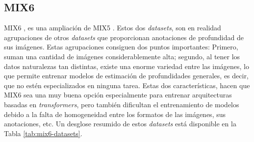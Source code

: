 \subsection{MIX6}
MIX6 \cite{visiontransformersDPT}, es una ampliación de MIX5 \cite{midas-intel}. Estos dos \textit{datasets}, son en realidad agrupaciones de otros \textit{datasets} que proporcionan anotaciones de profundidad de sus imágenes. Estas agrupaciones consiguen dos puntos importantes: Primero, suman una cantidad de imágenes considerablemente alta; segundo, al tener los datos naturalezas tan distintas, existe una enorme variedad entre las imágenes, lo que permite entrenar modelos de estimación de profundidades generales, es decir, que no estén especializados en ninguna tarea. Estas dos características, hacen que MIX6 sea una muy buena opción especialmente para entrenar arquitecturas basadas en \textit{transformers}, pero también dificultan el entrenamiento de modelos debido a la falta de homogeneidad entre los formatos de las imágenes, sus anotaciones, etc. Un desglose resumido de estos \textit{datasets} está disponible en la Tabla \ref{tab:mix6-datasets}.


